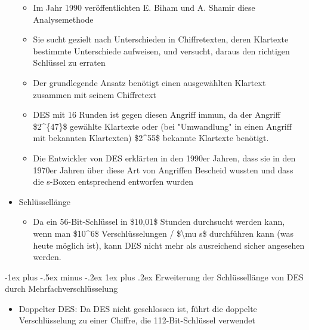 \documentclass[a4paper]{article}
\makeatletter
\renewcommand{\subsubsection}{\@startsection{subsubsection}{3}{0mm}%
 {-1ex plus -.5ex minus -.2ex}%
 {1ex plus .2ex}%
 {\normalfont\small\bfseries}}
\makeatother
\begin{document}
\begin{multicols}{3}
\begin{itemize}
              \begin{itemize}
                  \item
                        Im Jahr 1990 veröffentlichten E. Biham und A. Shamir diese
                        Analysemethode
                  \item
                        Sie sucht gezielt nach Unterschieden in Chiffretexten, deren
                        Klartexte bestimmte Unterschiede aufweisen, und versucht, daraus den
                        richtigen Schlüssel zu erraten
                  \item
                        Der grundlegende Ansatz benötigt einen ausgewählten Klartext
                        zusammen mit seinem Chiffretext
                  \item
                        DES mit 16 Runden ist gegen diesen Angriff immun, da der Angriff
                        \$2\^{}\{47\}\$ gewählte Klartexte oder (bei "Umwandlung" in einen
                        Angriff mit bekannten Klartexten) \$2\^{}55\$ bekannte Klartexte
                        benötigt.
                  \item
                        Die Entwickler von DES erklärten in den 1990er Jahren, dass sie in
                        den 1970er Jahren über diese Art von Angriffen Bescheid wussten und
                        dass die s-Boxen entsprechend entworfen wurden
              \end{itemize}
        \item
              Schlüssellänge

              \begin{itemize}
                  \item
                        Da ein 56-Bit-Schlüssel in \$10,01\$ Stunden durchsucht werden kann,
                        wenn man \$10\^{}6\$ Verschlüsselungen / \$\textbackslash mu s\$
                        durchführen kann (was heute möglich ist), kann DES nicht mehr als
                        ausreichend sicher angesehen werden.
              \end{itemize}
    \end{itemize}


    \subsubsection{Erweiterung der Schlüssellänge von DES durch
        Mehrfachverschlüsselung}

    \begin{itemize}
        \item
              Doppelter DES: Da DES nicht geschlossen ist, führt die doppelte
              Verschlüsselung zu einer Chiffre, die 112-Bit-Schlüssel verwendet


\end{itemize}
\end{multicols}
\end{document}
